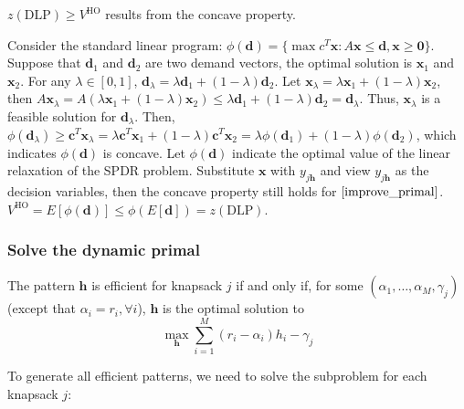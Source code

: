 

\begin{lem}
$z(\text{DLP}) \geq V^{\text{HO}}$ results from the concave property. 
\end{lem}

Consider the standard linear program: $\phi(\bm{d})= \{\max c^{T} \bm{x}: A \bm{x} \leq \bm{d}, \bm{x} \geq \bm{0}\}$.  Suppose that $\bm{d}_1$ and $\bm{d}_2$ are two demand vectors, the optimal solution is $\bm{x}_1$ and $\bm{x}_2$. For any $\lambda \in [0, 1]$, $\bm{d}_{\lambda} = \lambda \bm{d}_{1} + (1- \lambda) \bm{d}_{2}$. Let $\bm{x}_{\lambda} = \lambda \bm{x}_{1} + (1-\lambda) \bm{x}_{2}$, then $A \bm{x}_{\lambda} = A(\lambda \bm{x}_{1} + (1-\lambda) \bm{x}_{2}) \leq \lambda \bm{d}_{1} + (1- \lambda) \bm{d}_{2} = \bm{d}_{\lambda}$. Thus, $\bm{x}_{\lambda}$ is a feasible solution for $\bm{d}_{\lambda}$. Then, $\phi(\bm{d}_{\lambda}) \geq \bm{c}^{T} \bm{x}_{\lambda} = \lambda \bm{c}^{T} \bm{x}_{1} + (1-\lambda) \bm{c}^{T} \bm{x}_{2} = \lambda \phi(\bm{d}_{1}) + (1- \lambda) \phi(\bm{d}_{2})$, which indicates $\phi(\bm{d})$ is concave. Let $\phi(\bm{d})$ indicate the optimal value of the linear relaxation of the SPDR problem. Substitute $\bm{x}$ with $y_{j \bm{h}}$ and view $y_{j \bm{h}}$ as the decision variables, then the concave property still holds for $\eqref{improve_primal}$. $V^{\text{HO}} = E[\phi(\bm{d})] \leq \phi(E[\bm{d}]) = z(\text{DLP})$.

\subsubsection{Solve the dynamic primal}

The pattern $\bm{h}$ is efficient for knapsack $j$ if and only if, for some $(\alpha_{1}, \ldots, \alpha_{M}, \gamma_{j})$ (except that $\alpha_{i} = r_i, \forall i$), $\bm{h}$ is the optimal solution to $$\max_{\bm{h}} \sum_{i=1}^{M} (r_i - \alpha_{i}) h_{i} - \gamma_{j}$$

To generate all efficient patterns, we need to solve the subproblem for each knapsack $j$:

